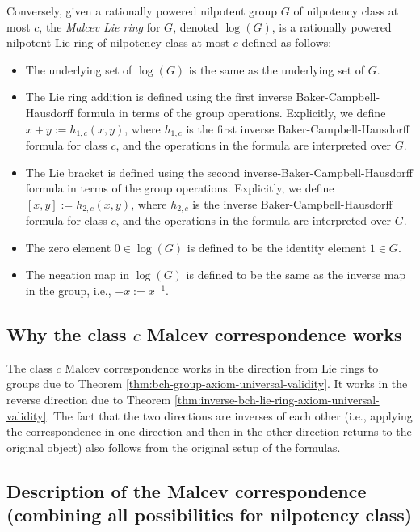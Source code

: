Conversely, given a rationally powered nilpotent group $G$ of
nilpotency class at most $c$, the {\em Malcev Lie ring} for $G$,
denoted $\log(G)$, is a rationally powered nilpotent Lie ring of
nilpotency class at most $c$ defined as follows:

\begin{itemize}
\item The underlying set of $\log(G)$ is the same as the underlying
  set of $G$.
\item The Lie ring addition is defined using the first inverse
  Baker-Campbell-Hausdorff formula in terms of the group
  operations. Explicitly, we define $x + y := h_{1,c}(x,y)$, where
  $h_{1,c}$ is the first inverse Baker-Campbell-Hausdorff formula for
  class $c$, and the operations in the formula are interpreted over
  $G$.
\item The Lie bracket is defined using the second
  inverse-Baker-Campbell-Hausdorff formula in terms of the group
  operations. Explicitly, we define $[x,y] := h_{2,c}(x,y)$, where
  $h_{2,c}$ is the inverse Baker-Campbell-Hausdorff formula for class
  $c$, and the operations in the formula are interpreted over $G$.
\item The zero element $0 \in \log(G)$ is defined to be the identity
  element $1 \in G$.
\item The negation map in $\log(G)$ is defined to be the same as the
  inverse map in the group, i.e., $-x := x^{-1}$.
\end{itemize}

\subsection{Why the class $c$ Malcev correspondence works}

The class $c$ Malcev correspondence works in the direction from Lie
rings to groups due to Theorem
\ref{thm:bch-group-axiom-universal-validity}. It works in the reverse
direction due to Theorem
\ref{thm:inverse-bch-lie-ring-axiom-universal-validity}. The fact that
the two directions are inverses of each other (i.e., applying the
correspondence in one direction and then in the other direction
returns to the original object) also follows from the original setup
of the formulas.

\subsection{Description of the Malcev correspondence (combining all possibilities for nilpotency class)}

